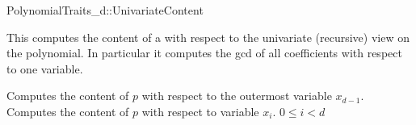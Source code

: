 \begin{ccRefConcept}{PolynomialTraits_d::UnivariateContent}

\ccDefinition

This  computes the content of a 
with respect to the univariate (recursive) view on the 
polynomial. In particular it computes the gcd of all 
coefficients  with respect to one variable. 

\ccRefines 
{}

\ccTypes

\ccGlue
{}\ccGlue

\ccOperations
{}
         {Computes the content of $p$ with respect to the outermost variable $x_{d-1}$. }
         {Computes the content of $p$ with respect to variable $x_i$. 
          \ccPrecond $0 \leq i  < d$
         }


\ccSeeAlso

\\

\end{ccRefConcept}
